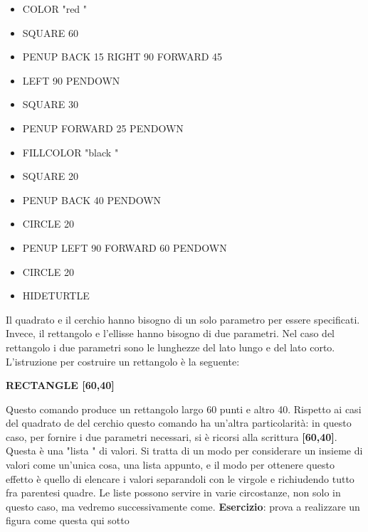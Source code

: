 \begin{scriptsize}
\begin{minipage}{0.40\textwidth}
\begin{itemize}[itemsep=-3pt,parsep=2pt]
\item[] COLOR  "red " 
\item[] SQUARE 60 
\item[] PENUP BACK 15 RIGHT 90 FORWARD 45                      
\item[] LEFT 90 PENDOWN 
\item[] SQUARE 30 
\item[] PENUP FORWARD 25 PENDOWN 
\item[] FILLCOLOR  "black "                      
\item[] SQUARE 20 
\item[] PENUP BACK 40 PENDOWN 
\item[] CIRCLE 20                                              
\item[] PENUP LEFT 90 FORWARD 60 PENDOWN 
\item[] CIRCLE 20
\item[] HIDETURTLE                                            
\end{itemize}
\end{minipage}
\end{scriptsize}

\vskip 1cm

Il quadrato e il cerchio hanno bisogno di un solo parametro per essere specificati. Invece, il rettangolo e l'ellisse hanno bisogno di due parametri. Nel caso del rettangolo i due parametri sono le lunghezze del lato lungo e del lato corto. L'istruzione per costruire un rettangolo è la seguente:

\textbf{RECTANGLE [60,40]}

Questo comando produce un rettangolo largo 60 punti e altro 40. Rispetto ai casi del quadrato de del cerchio questo comando ha un'altra particolarità: in questo caso, per fornire i due parametri necessari, si è ricorsi alla scrittura \textbf{[60,40]}. Questa è una  "lista " di valori. Si tratta di un modo per considerare un insieme di valori come un'unica cosa, una lista appunto, e il modo per ottenere questo effetto è quello di elencare i valori separandoli con le virgole e richiudendo tutto fra parentesi quadre. Le liste possono servire in varie circostanze, non solo in questo caso, ma vedremo successivamente come.
\textbf{Esercizio}: prova a realizzare un figura come questa qui sotto

